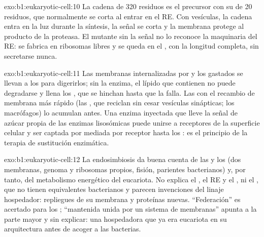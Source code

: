\begin{solution}{exo:b1:eukaryotic-cell:10}
La cadena de \qty{320}{} residuos es el precursor con su  de
\qty{20}{} residuos, que normalmente se corta al entrar en el RE. Con
vesículas, la cadena entra en la luz durante la síntesis, la señal se corta
y la membrana protege al producto de la proteasa. El mutante sin la señal no
lo reconoce la maquinaria del RE: se fabrica en ribosomas libres y se queda
en el , con la longitud completa, sin secretarse nunca.
\end{solution}

\begin{solution}{exo:b1:eukaryotic-cell:11}
Las membranas internalizadas por  y los  gastados se
llevan a los  para digerirlos; sin la enzima, el lípido que
contienen no puede degradarse y llena los , que se hinchan hasta
que la  falla. Las  con el recambio de membrana más rápido (las
, que reciclan sin cesar vesículas sinápticas; los macrófagos) lo
acumulan antes. Una enzima inyectada que lleve la señal de azúcar propia de
las enzimas lisosómicas puede unirse a receptores de la superficie celular y
ser captada por  mediada por receptor hasta los : es el
principio de la terapia de sustitución enzimática.
\end{solution}

\begin{solution}{exo:b1:eukaryotic-cell:12}
La endosimbiosis da buena cuenta de las  y los  (dos
membranas, genoma y ribosomas propios, fisión, parientes bacterianos) y, por
tanto, del metabolismo energético del eucariota. No explica el , el RE
y el , ni el , que no tienen equivalentes bacterianos y
parecen invenciones del linaje hospedador: repliegues de su membrana y
proteínas nuevas. ``Federación'' es acertado para los ; ``mantenida
unida por un sistema de membranas'' apunta a la parte mayor y sin explicar:
una  hospedadora que ya era eucariota en su arquitectura antes de
acoger a las bacterias.
\end{solution}

